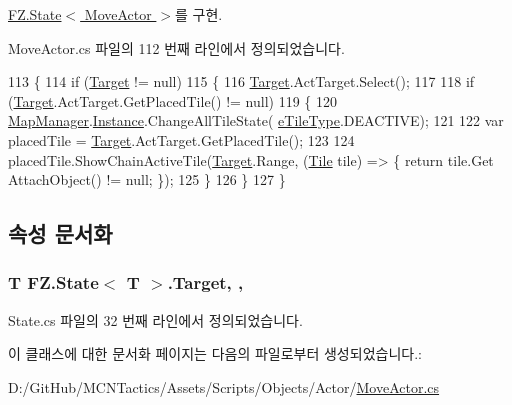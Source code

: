 \hyperlink{class_f_z_1_1_state_acaf1584680a2e69e2a4da20574723981}{F\+Z.\+State$<$ Move\+Actor $>$}를 구현.



Move\+Actor.\+cs 파일의 112 번째 라인에서 정의되었습니다.


\begin{DoxyCode}
113         \{
114             \textcolor{keywordflow}{if} (\hyperlink{class_f_z_1_1_state_a6927f5c9f2517052f9dc5596188e9d95}{Target} != null)
115             \{
116                 \hyperlink{class_f_z_1_1_state_a6927f5c9f2517052f9dc5596188e9d95}{Target}.ActTarget.Select();
117 
118                 \textcolor{keywordflow}{if} (\hyperlink{class_f_z_1_1_state_a6927f5c9f2517052f9dc5596188e9d95}{Target}.ActTarget.GetPlacedTile() != null)
119                 \{
120                     \hyperlink{class_map_manager}{MapManager}.\hyperlink{class_f_z_1_1_mono_singletone_a39e34129d25a9664576949259e7dfd5f}{Instance}.ChangeAllTileState(
      \hyperlink{_tile_8cs_a271bc07be325bca511bcb747e0ff2fda}{eTileType}.DEACTIVE);
121 
122                     var placedTile = \hyperlink{class_f_z_1_1_state_a6927f5c9f2517052f9dc5596188e9d95}{Target}.ActTarget.GetPlacedTile();
123 
124                     placedTile.ShowChainActiveTile(\hyperlink{class_f_z_1_1_state_a6927f5c9f2517052f9dc5596188e9d95}{Target}.Range, (\hyperlink{class_tile}{Tile} tile) => \{ return tile.Get
      AttachObject() != null; \});
125                 \}
126             \}
127         \}
\end{DoxyCode}


\subsection{속성 문서화}
\subsubsection[{\texorpdfstring{Target}{Target}}]{\setlength{\rightskip}{0pt plus 5cm}T {\bf F\+Z.\+State}$<$ T $>$.Target\hspace{0.3cm}{\ttfamily [get]}, {\ttfamily [protected]}, {\ttfamily [inherited]}}\hypertarget{class_f_z_1_1_state_a6927f5c9f2517052f9dc5596188e9d95}{}\label{class_f_z_1_1_state_a6927f5c9f2517052f9dc5596188e9d95}


State.\+cs 파일의 32 번째 라인에서 정의되었습니다.



이 클래스에 대한 문서화 페이지는 다음의 파일로부터 생성되었습니다.\+:\begin{DoxyCompactItemize}
\item 
D\+:/\+Git\+Hub/\+M\+C\+N\+Tactics/\+Assets/\+Scripts/\+Objects/\+Actor/\hyperlink{_move_actor_8cs}{Move\+Actor.\+cs}\end{DoxyCompactItemize}
